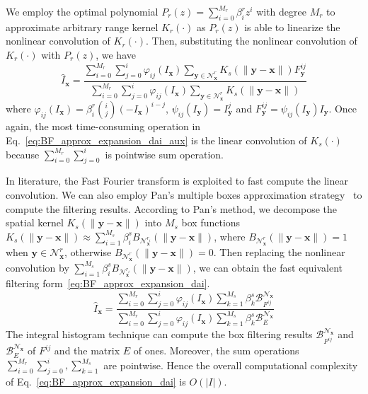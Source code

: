 \documentclass[twocolumn]{el-author}
\begin{document}
We employ the optimal polynomial $P_r(z) = \sum_{i = 0}^{M_r}  \beta^r_i z^i$ with degree $M_r$ to approximate arbitrary range kernel $K_r(\cdot)$ as $P_r(z)$ is able to linearize the nonlinear convolution of $K_r(\cdot)$. Then, substituting the nonlinear convolution of $K_r(\cdot)$ with $P_r(z)$, we have
%
\begin{equation}
\hat{I}_{\bm{x}} = \frac{\sum_{i = 0}^{M_r} \sum_{j = 0}^{i} \varphi_{ij} (I_{\bm{x}}) \sum_{\bm{y} \in \mathcal{N}^{r}_{\bm{x}}} K_{s}(\|\bm{y}-\bm{x}\|)  F^{ij}_{\bm{y}} }{\sum_{i = 0}^{M_r} \sum_{j = 0}^{i} \varphi_{ij}(I_{\bm{x}}) \sum_{\bm{y} \in \mathcal{N}^{r}_{\bm{x}}} K_{s}(\|\bm{y}-\bm{x}\|) }
\label{eq:BF_approx_expansion_dai_aux}
\end{equation}
%
where $\varphi_{ij}(I_{\bm{x}}) = \beta^r_i {i \choose j} (-I_{\bm{x}})^{i-j} $, $\psi_{ij}(I_{\bm{y}}) = I^j_{\bm{y}} $ and $F^{ij}_{\bm{y}} =  \psi_{ij}(I_{\bm{y}})  I_{\bm{y}}$. Once again, the most time-consuming operation in Eq.~\eqref{eq:BF_approx_expansion_dai_aux} is the linear convolution of $K_{s}(\cdot)$ because $\sum_{i = 0}^{M_r} \sum_{j = 0}^{i}$ is pointwise sum operation.

In literature, the Fast Fourier transform is exploited to fast compute the linear convolution. We can also employ Pan's multiple boxes approximation strategy~\cite{Pan_MPE_2014} to compute the filtering results. According to Pan's method, we decompose the spatial kernel $K_s(\| \bm{y} - \bm{x} \|)$ into $M_s$ box functions $K_s(\| \bm{y} - \bm{x} \|) \approx \sum_{i = 1}^{M_s} \beta^s_i B_{\mathcal{N}^{r_i}_{\bm{x}}}(\| \bm{y} - \bm{x} \|)$, where $B_{\mathcal{N}^{r}_{\bm{x}}}(\| \bm{y} - \bm{x} \|) = 1$ when $\bm{y} \in \mathcal{N}^{r}_{\bm{x}}$, otherwise $B_{\mathcal{N}^{r}_{\bm{x}}}(\| \bm{y} - \bm{x} \|) = 0$. Then replacing the nonlinear convolution by $\sum_{i = 1}^{M_s} \beta^s_i B_{\mathcal{N}^{r_i}_{\bm{x}}}(\| \bm{y} - \bm{x} \|)$, we can obtain the fast equivalent filtering form~\eqref{eq:BF_approx_expansion_dai}.
%
\begin{equation}
\hat{I}_{\bm{x}} = \frac{\sum_{i = 0}^{M_r} \sum_{j = 0}^{i} \varphi_{ij} (I_{\bm{x}}) \sum_{k = 1}^{M_s} \beta^s_k  \mathcal{B}^{\mathcal{N}_{\bm{x}}}_{  F^{ij}  }   }{\sum_{i = 0}^{M_r} \sum_{j = 0}^{i} \varphi_{ij}(I_{\bm{x}}) \sum_{k = 1}^{M_s} \beta^s_k   \mathcal{B}^{\mathcal{N}_{\bm{x}}}_{ E } }
\label{eq:BF_approx_expansion_dai}
\end{equation}
%
The integral histogram technique can compute the box filtering results $\mathcal{B}^{\mathcal{N}_{\bm{x}}}_{  F^{ij} }$ and $\mathcal{B}^{\mathcal{N}_{\bm{x}}}_{ E }$ of $F^{ij}$ and the matrix $E$ of
ones. Moreover, the sum operations $\sum_{i = 0}^{M_r} \sum_{j = 0}^{i}, \sum_{k = 1}^{M_s} $ are pointwise. Hence the overall computational complexity of Eq.~\eqref{eq:BF_approx_expansion_dai} is $O(|I|)$.
\end{document}
